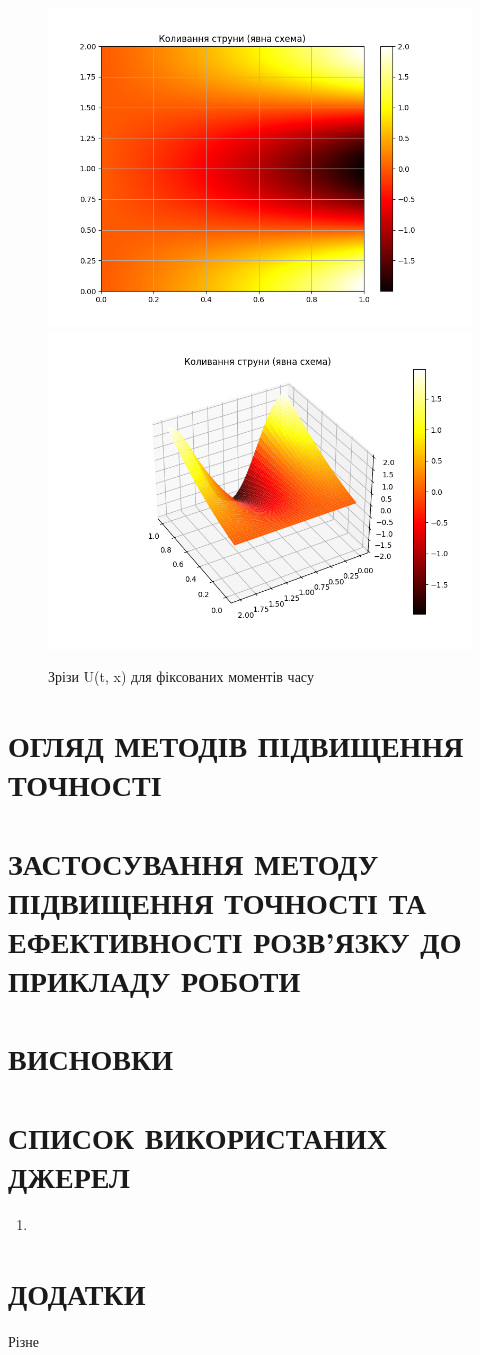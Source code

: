 \documentclass{article}
\begin{document}
        \begin{figure}[h!]
            \includegraphics[width=0.5\linewidth]{straight_2d.png}
            \includegraphics[width=0.5\linewidth]{straight_3d.png}
            \caption{Зрізи U(t, x) для фіксованих моментів часу}
        \end{figure}

    \newpage
    \section{ОГЛЯД МЕТОДІВ ПІДВИЩЕННЯ ТОЧНОСТІ}

    \newpage
    \section{ЗАСТОСУВАННЯ МЕТОДУ ПІДВИЩЕННЯ ТОЧНОСТІ ТА ЕФЕКТИВНОСТІ РОЗВ’ЯЗКУ ДО ПРИКЛАДУ РОБОТИ}

    \newpage
    \section{ВИСНОВКИ}
    \newpage
    \section{СПИСОК ВИКОРИСТАНИХ ДЖЕРЕЛ}
    \begin{enumerate}
        \item 
    \end{enumerate}
    \newpage
    \section{ДОДАТКИ}
        Різне
\end{document}
